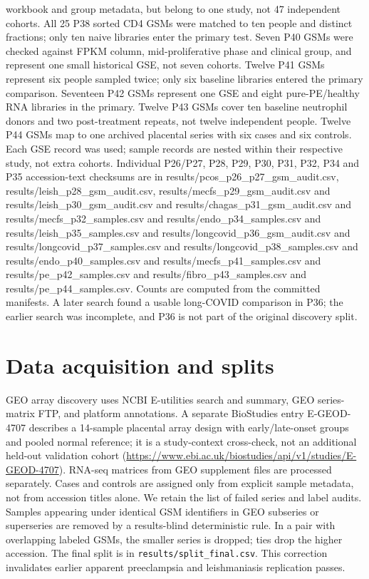\documentclass[11pt,a4paper]{article}
\begin{document}
workbook and group metadata, but belong to one study, not 47 independent cohorts. All 25 P38 sorted CD4 GSMs were matched to ten people and distinct fractions; only ten naive libraries enter the primary test. Seven P40 GSMs were checked against FPKM column, mid-proliferative phase and clinical group, and represent one small historical GSE, not seven cohorts. Twelve P41 GSMs represent six people sampled twice; only six baseline libraries entered the primary comparison. Seventeen P42 GSMs represent one GSE and eight pure-PE/healthy RNA libraries in the primary. Twelve P43 GSMs cover ten baseline neutrophil donors and two post-treatment repeats, not twelve independent people. Twelve P44 GSMs map to one archived placental series with six cases and six controls. Each GSE record was used; sample records are nested within their respective study, not extra cohorts. Individual P26/P27, P28, P29, P30, P31, P32, P34 and P35 accession-text checksums are in results/pcos\_p26\_p27\_gsm\_audit.csv, results/leish\_p28\_gsm\_audit.csv, results/mecfs\_p29\_gsm\_audit.csv and results/leish\_p30\_gsm\_audit.csv and results/chagas\_p31\_gsm\_audit.csv and results/mecfs\_p32\_samples.csv and results/endo\_p34\_samples.csv and results/leish\_p35\_samples.csv and results/longcovid\_p36\_gsm\_audit.csv and results/longcovid\_p37\_samples.csv and results/longcovid\_p38\_samples.csv and results/endo\_p40\_samples.csv and results/mecfs\_p41\_samples.csv and results/pe\_p42\_samples.csv and results/fibro\_p43\_samples.csv and results/pe\_p44\_samples.csv. Counts are computed from the committed manifests. A later search found a usable long-COVID comparison in P36; the earlier search was incomplete, and P36 is not part of the original discovery split.
\section{Data acquisition and splits}
GEO array discovery uses NCBI E-utilities search and summary, GEO series-matrix FTP, and platform annotations. A separate BioStudies entry E-GEOD-4707 describes a 14-sample placental array design with early/late-onset groups and pooled normal reference; it is a study-context cross-check, not an additional held-out validation cohort (\url{https://www.ebi.ac.uk/biostudies/api/v1/studies/E-GEOD-4707}). RNA-seq matrices from GEO supplement files are processed separately. Cases and controls are assigned only from explicit sample metadata, not from accession titles alone. We retain the list of failed series and label audits. Samples appearing under identical GSM identifiers in GEO subseries or superseries are removed by a results-blind deterministic rule. In a pair with overlapping labeled GSMs, the smaller series is dropped; ties drop the higher accession. The final split is in \texttt{results/split\_final.csv}. This correction invalidates earlier apparent preeclampsia and leishmaniasis replication passes.
\end{document}
